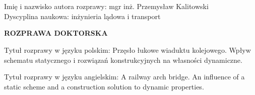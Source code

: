 	
\begin{titlepage}
		\begin{figure}
			\hfill
		
		\end{figure}

		
		
	
		\begin{myfont}
		
		\footnotesize
		\noindent
		\\ \\
		Imię i nazwisko autora rozprawy: mgr inż. Przemysław Kalitowski \\
		Dyscyplina naukowa: inżynieria lądowa i transport
		\vspace{3.5cm}
		
		\normalsize
		\noindent
		\textbf{ROZPRAWA DOKTORSKA}
		\vspace{3.5cm}
		
		\footnotesize
		\noindent
		Tytuł rozprawy w języku polskim: Przęsło łukowe wiaduktu kolejowego. Wpływ schematu statycznego i rozwiązań konstrukcyjnych na własności dynamiczne.
		
		\vspace{0.5cm}
		\noindent
		Tytuł rozprawy w języku angielskim: A railway arch bridge. An influence of a static scheme and a construction solution to dynamic properties.
		\vspace{2cm}		
		

\end{myfont}
\end{titlepage}
